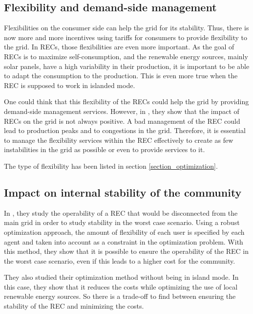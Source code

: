 \documentclass[12pt,a4paper]{article}
\begin{document}
\subsection{Flexibility and demand-side management}


Flexibilities on the consumer side can help the grid for its stability. Thus, there is now more and more incentives using tariffs for consumers to provide flexibility to the grid. In RECs, those flexibilities are even more important. As the goal of RECs is to maximize self-consumption, and the renewable energy sources, mainly solar panels, have a high variability in their production, it is important to be able to adapt the consumption to the production. This is even more true when the REC is supposed to work in islanded mode.

One could think that this flexibility of the RECs could help the grid by providing demand-side management services. However, in \cite{article_10}, they show that the impact of RECs on the grid is not always positive. A bad management of the REC could lead to production peaks and to congestions in the grid. Therefore, it is essential to manage the flexibility services within the REC effectively to create as few instabilities in the grid as possible or even to provide services to it.

The type of flexibility has been listed in section \ref{section_optimization}. 

\subsection{Impact on internal stability of the community}
In \cite{article_5}, they study the operability of a REC that would be disconnected from the main grid in order to study stability in the worst case scenario. Using a robust optimization approach, the amount of flexibility of each user is specified by each agent and taken into account as a constraint in the optimization problem. With this method, they show that it is possible to ensure the operability of the REC in the worst case scenario, even if this leads to a higher cost for the community.

They also studied their optimization method without being in island mode. In this case, they show that it reduces the costs while optimizing the use of local renewable energy sources. So there is a trade-off to find between ensuring the stability of the REC and minimizing the costs.
\end{document}
